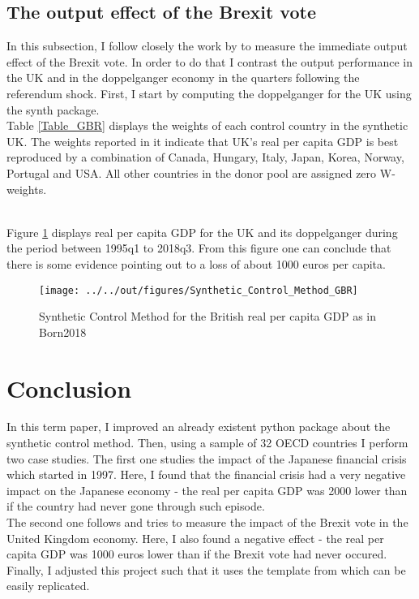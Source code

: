\documentclass[11pt, a4paper, leqno]{article}
\begin{document}
\clearpage

\subsection{The output effect of the Brexit vote}
\label{Brexit}

In this subsection, I follow closely the work by \citet{Born2018} to measure the immediate output effect of the Brexit vote. In order to do
that I contrast the output performance in the UK and in the doppelganger economy in the quarters following the referendum shock. First, I start by computing the doppelganger for the UK using the synth package.\\

Table \ref{Table_GBR} displays the weights of each control country in the synthetic UK. The weights reported in it indicate that UK's real per capita GDP is best reproduced by a combination of Canada, Hungary, Italy, Japan, Korea, Norway, Portugal and USA. All other countries in the donor pool are assigned zero W-weights.\\

 \label{Table_GBR} \\

\newpage

Figure \ref{GBR} displays real per capita GDP for the UK and its doppelganger during the period between 1995q1 to 2018q3. From this figure one can conclude that there is some evidence pointing out to a loss of about 1000 euros per capita. \\

\begin{figure}[!htbp]
    \caption{Synthetic Control Method for the British real per capita GDP as in Born2018}
    \texttt{[image: ../../out/figures/Synthetic\_Control\_Method\_GBR]}
    \label{GBR}
\end{figure}

\clearpage 
\section{Conclusion}
In this term paper, I improved an already existent python package about the synthetic control method. Then, using a sample of 32 OECD countries I perform two case studies. The first one studies the impact of the Japanese financial crisis which started in 1997. Here, I found that the financial crisis had a very negative impact on the Japanese economy - the real per capita GDP was 2000 lower than if the country had never gone through such episode.\\

The second one follows \citet{Born2018} and tries to measure the impact of the Brexit vote in the United Kingdom economy. Here, I also found a negative effect - the real per capita GDP was 1000 euros lower than if the Brexit vote had never occured.\\

Finally, I adjusted this project such that it uses the template from \citet{GaudeckerEconProjectTemplates} which can be easily replicated.

\clearpage



\end{document}
